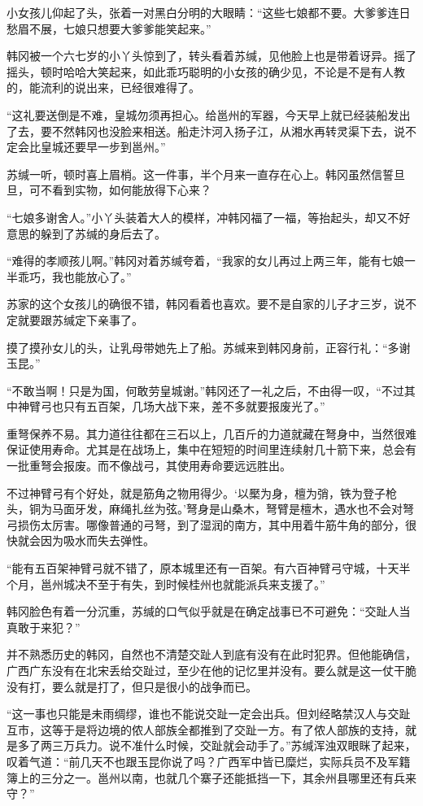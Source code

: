 小女孩儿仰起了头，张着一对黑白分明的大眼睛：“这些七娘都不要。大爹爹连日愁眉不展，七娘只想要大爹爹能笑起来。”

韩冈被一个六七岁的小丫头惊到了，转头看着苏缄，见他脸上也是带着讶异。摇了摇头，顿时哈哈大笑起来，如此乖巧聪明的小女孩的确少见，不论是不是有人教的，能流利的说出来，已经很难得了。

“这礼要送倒是不难，皇城勿须再担心。给邕州的军器，今天早上就已经装船发出了去，要不然韩冈也没脸来相送。船走汴河入扬子江，从湘水再转灵渠下去，说不定会比皇城还要早一步到邕州。”

苏缄一听，顿时喜上眉梢。这一件事，半个月来一直存在心上。韩冈虽然信誓旦旦，可不看到实物，如何能放得下心来？

“七娘多谢舍人。”小丫头装着大人的模样，冲韩冈福了一福，等抬起头，却又不好意思的躲到了苏缄的身后去了。

“难得的孝顺孩儿啊。”韩冈对着苏缄夸着，“我家的女儿再过上两三年，能有七娘一半乖巧，我也能放心了。”

苏家的这个女孩儿的确很不错，韩冈看着也喜欢。要不是自家的儿子才三岁，说不定就要跟苏缄定下亲事了。

摸了摸孙女儿的头，让乳母带她先上了船。苏缄来到韩冈身前，正容行礼：“多谢玉昆。”

“不敢当啊！只是为国，何敢劳皇城谢。”韩冈还了一礼之后，不由得一叹，“不过其中神臂弓也只有五百架，几场大战下来，差不多就要报废光了。”

重弩保养不易。其力道往往都在三石以上，几百斤的力道就藏在弩身中，当然很难保证使用寿命。尤其是在战场上，集中在短短的时间里连续射几十箭下来，总会有一批重弩会报废。而不像战弓，其使用寿命要远远胜出。

不过神臂弓有个好处，就是筋角之物用得少。‘以檿为身，檀为弰，铁为登子枪头，铜为马面牙发，麻绳扎丝为弦。’弩身是山桑木，弩臂是檀木，遇水也不会对弩弓损伤太厉害。哪像普通的弓弩，到了湿润的南方，其中用着牛筋牛角的部分，很快就会因为吸水而失去弹性。

“能有五百架神臂弓就不错了，原本城里还有一百架。有六百神臂弓守城，十天半个月，邕州城决不至于有失，到时候桂州也就能派兵来支援了。”

韩冈脸色有着一分沉重，苏缄的口气似乎就是在确定战事已不可避免：“交趾人当真敢于来犯？”

并不熟悉历史的韩冈，自然也不清楚交趾人到底有没有在此时犯界。但他能确信，广西广东没有在北宋丢给交趾过，至少在他的记忆里并没有。要么就是这一仗干脆没有打，要么就是打了，但只是很小的战争而已。

“这一事也只能是未雨绸缪，谁也不能说交趾一定会出兵。但刘经略禁汉人与交趾互市，这等于是将边境的侬人部族全都推到了交趾一方。有了侬人部族的支持，就是多了两三万兵力。说不准什么时候，交趾就会动手了。”苏缄浑浊双眼眯了起来，叹着气道：“前几天不也跟玉昆你说了吗？广西军中皆已糜烂，实际兵员不及军籍簿上的三分之一。邕州以南，也就几个寨子还能抵挡一下，其余州县哪里还有兵来守？”

